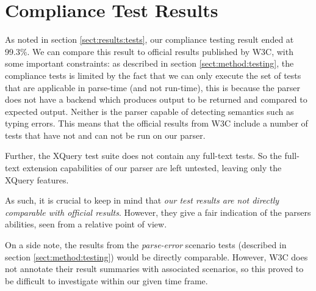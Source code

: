 \section{Compliance Test Results}
\label{sect:discussion:coverageResults}
As noted in section \ref{sect:results:tests}, our compliance testing result ended
at 99.3\%. We can compare this result to official results published by W3C, with
some  important constraints: as described in section \ref{sect:method:testing},
the compliance tests is limited by the fact that we can only execute the set of
tests that are applicable in parse-time (and not run-time), this is because the
parser does not have a backend which produces output to be returned and compared
to expected output. Neither is the parser capable of detecting semantics such as
typing errors. This means that the official results from W3C include a number
of tests that have not and can not be run on our parser.

Further, the XQuery test suite does not contain any full-text tests. So the
full-text extension capabilities of our parser are left untested, leaving only the XQuery features.

As such, it is crucial to keep in mind that \emph{our test results are not directly
comparable with official results}. However, they give a fair indication of the
parsers abilities, seen from a relative point of view.

On a side note, the results from the \emph{parse-error} scenario tests
(described in  section \ref{sect:method:testing}) would be directly comparable.
However, W3C does not annotate their result summaries with associated scenarios,
so this proved to be difficult to investigate within our given time frame.

